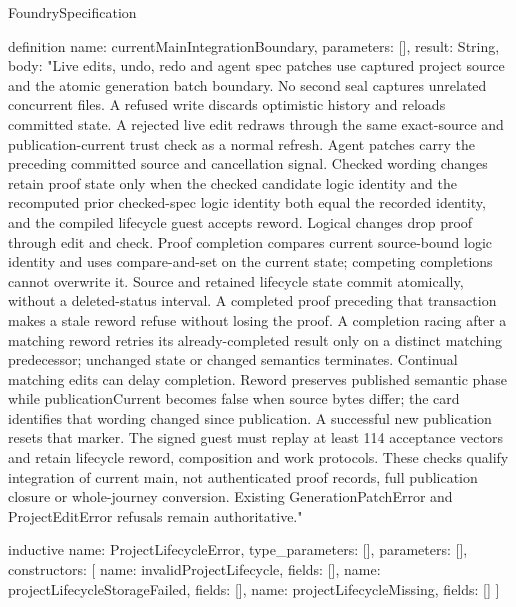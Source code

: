 \begin{lexlean}{FoundrySpecification}
\begin{semanticmodule}
definition{
  name: currentMainIntegrationBoundary,
  parameters: [],
  result: String,
  body: "Live edits, undo, redo and agent spec patches use captured project source and the atomic generation batch boundary. No second seal captures unrelated concurrent files. A refused write discards optimistic history and reloads committed state. A rejected live edit redraws through the same exact-source and publication-current trust check as a normal refresh. Agent patches carry the preceding committed source and cancellation signal. Checked wording changes retain proof state only when the checked candidate logic identity and the recomputed prior checked-spec logic identity both equal the recorded identity, and the compiled lifecycle guest accepts reword. Logical changes drop proof through edit and check. Proof completion compares current source-bound logic identity and uses compare-and-set on the current state; competing completions cannot overwrite it. Source and retained lifecycle state commit atomically, without a deleted-status interval. A completed proof preceding that transaction makes a stale reword refuse without losing the proof. A completion racing after a matching reword retries its already-completed result only on a distinct matching predecessor; unchanged state or changed semantics terminates. Continual matching edits can delay completion. Reword preserves published semantic phase while publicationCurrent becomes false when source bytes differ; the card identifies that wording changed since publication. A successful new publication resets that marker. The signed guest must replay at least 114 acceptance vectors and retain lifecycle reword, composition and work protocols. These checks qualify integration of current main, not authenticated proof records, full publication closure or whole-journey conversion. Existing GenerationPatchError and ProjectEditError refusals remain authoritative."
}

inductive{
  name: ProjectLifecycleError,
  type_parameters: [],
  parameters: [],
  constructors: [
    {name: invalidProjectLifecycle, fields: []},
    {name: projectLifecycleStorageFailed, fields: []},
    {name: projectLifecycleMissing, fields: []}
  ]
}


\end{semanticmodule}
\end{lexlean}

